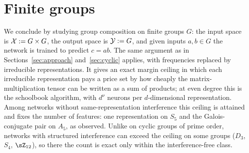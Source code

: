 \section{Finite groups}\label{sec:groups}

We conclude by studying group composition on finite groups $G$: the input space is $\mathcal{X}:=G\times G$, the output space is $\mathcal{Y}:=G$, and given inputs $a,b\in G$ the network is trained to predict $c=ab$. The same argument as in Sections~\ref{sec:approach} and~\ref{sec:cyclic} applies, with frequencies replaced by irreducible representations. It gives an exact margin ceiling in which each irreducible representation pays a price set by how cheaply the matrix-multiplication tensor can be written as a sum of products; at even degree this is the schoolbook algorithm, with $d^\nu$ neurons per $d$-dimensional representation. Among networks without same-representation interference this ceiling is attained and fixes the number of features: one representation on $S_5$ and the Galois-conjugate pair on $A_5$, as observed. Unlike on cyclic groups of prime order, networks with structured interference can exceed the ceiling on some groups ($D_3$, $S_4$, $\sZ_{12}$), so there the count is exact only within the interference-free class.
